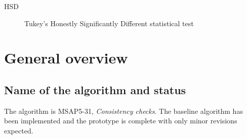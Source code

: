 \documentclass[a4paper, oneside, 11pt, article, english]{memoir}
\begin{document}
\begin{description}
  \firmlist
  \item[HSD] Tukey's Honestly Significantly Different statistical test
\end{description}


\clearpage
\chapter{General overview}
\label{chap:overview}

\section{Name of the algorithm and status}
\label{sec:name}
The algorithm is MSAP5-31, \emph{Consistency checks}. 
The baseline algorithm has been implemented and the prototype is complete with only minor revisions expected. 
\end{document}
